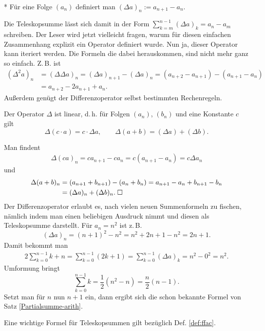 \begin{Definition}[Differenzoperator]\mbox{}\\*
Für eine Folge $(a_n)$ definiert man
$(\Delta a)_n := a_{n+1}-a_n.$
\end{Definition}
Die Teleskopsumme lässt sich damit in der Form
$\sum_{k=m}^{n-1}(\Delta a)_k = a_n-a_m$
schreiben. Der Leser wird jetzt vielleicht fragen, warum für diesen
einfachen Zusammenhang explizit ein Operator definiert wurde.
Nun ja, dieser Operator kann iteriert werden. Die Formeln die
dabei herauskommen, sind nicht mehr ganz so einfach. Z.\,B. ist
\begin{align*}
(\Delta^2 a)_n &= (\Delta \Delta a)_n
= (\Delta a)_{n+1}-(\Delta a)_n
= (a_{n+2}-a_{n+1}) - (a_{n+1}-a_n)\\
&= a_{n+2}-2a_{n+1}+a_n.
\end{align*}
Außerdem genügt der Differenzoperator selbst bestimmten Rechenregeln.
\begin{Satz}
Der Operator $\Delta$ ist linear, d.\,h. für
Folgen $(a_n)$, $(b_n)$ und eine Konstante $c$ gilt%
\[\Delta(c\cdot a) = c\cdot\Delta a,\qquad
\Delta(a+b) = (\Delta a)+(\Delta b).\]
\end{Satz}
 Man findent
\begin{gather*}
\Delta (ca)_n = ca_{n+1}-ca_n
= c(a_{n+1}-a_n) = c\Delta a_n
\end{gather*}
und
\begin{align*}
\Delta (a+b)_n &= (a_{n+1}+b_{n+1})-(a_n+b_n)
= a_{n+1}-a_n + b_{n+1}-b_n\\
&= (\Delta a)_n + (\Delta b)_n.\;\Box
\end{align*}
Der Differenzoperator erlaubt es, nach vielen neuen Summenformeln
zu fischen, nämlich indem man einen beliebigen Ausdruck nimmt und
diesen als Teleskopsumme darstellt. Für $a_n=n^2$ ist z.\,B.
\[(\Delta a)_n = (n+1)^2-n^2 = n^2+2n+1-n^2 = 2n+1.\]
Damit bekommt man
\begin{gather*}
2\sum_{k=0}^{n-1} k + n = \sum_{k=0}^{n-1} (2k+1) = 
\sum_{k=0}^{n-1} (\Delta a)_k
= n^2-0^2 = n^2.
\end{gather*}
Umformung bringt
\[\sum_{k=0}^{n-1} k = \frac{1}{2}(n^2-n) = \frac{n}{2}(n-1).\]
Setzt man für $n$ nun $n+1$ ein, dann ergibt sich die schon
bekannte Formel von Satz \ref{Partialsumme-arith}.

Eine wichtige Formel für Teleskopsummen gilt
bezüglich Def. \ref{def:ffac}.

